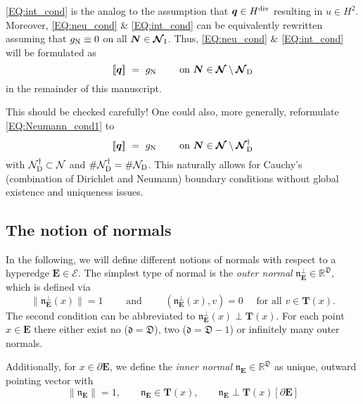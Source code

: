 \documentclass[a4paper, english, 12pt, reqno, draft]{amsart}
\theoremstyle{definition}
\theoremstyle{remark}
\numberwithin{equation}{section}
\newcommand{\setNode}{\ensuremath{\mathcal N}}
\newcommand{\setNodeDir}{\ensuremath{\setNode_\textup D}}
\newcommand{\SetEdge}{\ensuremath{\boldsymbol{\mathcal E}}}
\newcommand{\SetNode}{\ensuremath{\boldsymbol{\mathcal N}}}
\newcommand{\SetNodeDir}{\ensuremath{\SetNode_\textup D}}
\newcommand{\SetNodeInt}{\ensuremath{\SetNode_\textup I}}
\newcommand{\Edge}{{\ensuremath{\boldsymbol E}}}
\newcommand{\Node}{{\ensuremath{\boldsymbol N}}}
\newcommand{\locDim}{\ensuremath{\mathfrak d}}
\newcommand{\globDim}{\ensuremath{\mathfrak D}}
\newcommand{\tangent}{\ensuremath{{\boldsymbol T}}}
\newcommand{\Normal}{\ensuremath{\mathfrak n_\Edge}}
\newcommand{\NormalOuter}{\ensuremath{\mathfrak n^\perp_\Edge}}
\newcommand{\jump}[1]{{[\![ #1 ]\!]}}
\newcommand{\IR}{\ensuremath{\mathbb R}}
\renewcommand{\vec}[1]{\ensuremath{\boldsymbol{#1}}}
\begin{document}
\eqref{EQ:int_cond} is the analog to the assumption that $\vec q \in H^\textup{div}$ resulting in $u \in H^2$. Moreover, \eqref{EQ:neu_cond} \& \eqref{EQ:int_cond} can be equivalently rewritten assuming that $g_\text N \equiv 0$ on all $\Node \in \SetNodeInt$. Thus, \eqref{EQ:neu_cond} \& \eqref{EQ:int_cond} will be formulated as
% 
\begin{equation}\label{EQ:Neumann_cond1}
 \jump{\vec q} ~=~ g_\textup N \qquad \text{ on } \Node \in \SetNode \setminus \SetNodeDir
\end{equation}
% 
in the remainder of this manuscript.
% 
\begin{envarerror}{This should be checked carefully!}
% 
One could also, more generally, reformulate \eqref{EQ:Neumann_cond1} to
% 
\begin{equation}
 \jump{\vec q} ~=~ g_\textup N \qquad \text{ on } \Node \in \SetNode \setminus \SetNodeDir^\dagger
\end{equation}
% 
with $\setNodeDir^\dagger \subset \setNode$ and $\# \setNodeDir^\dagger = \# \setNodeDir$. This naturally allows for Cauchy's (combination of Dirichlet and Neumann) boundary conditions without global existence and uniqueness issues.
% 
\end{envarerror}
% 
\subsection{The notion of normals}\label{SEC:normals}
% 
In the following, we will define different notions of normals with respect to a hyperedge $\Edge \in \SetEdge$. The simplest type of normal is the \emph{outer normal} $\NormalOuter \in \IR^\globDim$, which is defined via
% 
\begin{equation*}
 \|\NormalOuter(x)\| = 1 \qquad \text{ and } \qquad (\NormalOuter(x), v) = 0 \quad \text{ for all } v \in \tangent(x).
\end{equation*}
% 
The second condition can be abbreviated to $\NormalOuter(x) \perp \tangent(x)$. For each point $x \in \Edge$ there either exist no ($\locDim = \globDim$), two ($\locDim = \globDim - 1$) or infinitely many outer normals.

Additionally, for $x \in \partial \Edge$, we define the \emph{inner normal} $\Normal \in \IR^\globDim$ as unique, outward pointing vector with
%
\begin{equation}\label{EQ:inner_const}
 \| \Normal \| = 1, \qquad \Normal \in \tangent(x), \qquad \Normal \perp \tangent(x) [\partial \Edge]
\end{equation}
\end{document}
